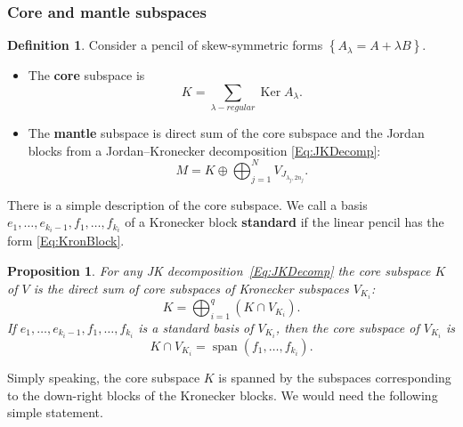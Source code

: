 \documentclass[12pt]{article}
\newtheorem{proposition}[lemma]{Proposition}
\theoremstyle{definition}
\newtheorem{definition}[lemma]{Definition}
\begin{document}
\subsubsection{Core and mantle subspaces}

\begin{definition} Consider a pencil of skew-symmetric forms $\left\{ A_{\lambda} = A + \lambda B\right\}$. 


\begin{itemize} 

\item The \textbf{core} subspace is \[ K = \sum_{\lambda - regular} \operatorname{Ker} A_{\lambda}. \]

\item The \textbf{mantle} subspace is direct sum of the core subspace and the Jordan blocks from a Jordan--Kronecker decomposition \eqref{Eq:JKDecomp}: \[ M = K \oplus  \bigoplus_{j=1}^N  V_{J_{\lambda_j, 2n_j}}. \] 


\end{itemize}

\end{definition} 

There is a simple description of the core subspace. We call a basis $e_1, \dots, e_{k_i-1},  f_1, \dots, f_{k_i}$   of a Kronecker block \textbf{standard} if the linear pencil has the form \eqref{Eq:KronBlock}.

\begin{proposition} \label{Cor:CoreMantle} For any JK decomposition~\eqref{Eq:JKDecomp} the core subspace $K$ of $V$ is the direct sum of core subspaces of Kronecker subspaces $V_{K_i}$: \[ K = \bigoplus_{i=1}^q \left(K \cap V_{K_i}\right).\] If $e_1, \dots, e_{k_i-1},  f_1, \dots, f_{k_i}$ is a standard basis of $V_{K_i}$, then the core subspace of $V_{K_i}$ is \[K \cap V_{K_i} = \operatorname{span} \left(f_1, \dots, f_{k_i} \right).\] \end{proposition} 

Simply speaking, the core subspace $K$ is spanned by the subspaces corresponding to the down-right blocks of the Kronecker blocks. We would need the following simple statement.
\end{document}
